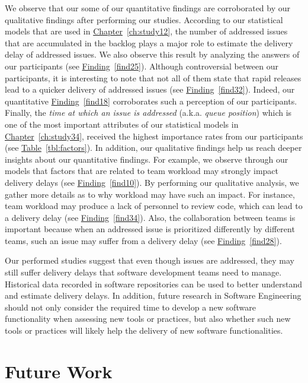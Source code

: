 We observe that our some of our quantitative findings are corroborated by our
qualitative findings after performing our studies. According to our statistical
models that are used in \hyperref[ch:study12]{Chapter}~\ref{ch:study12}, the
number of addressed issues that are accumulated in the backlog plays a major
role to estimate the delivery delay of addressed issues. We also observe this
result by analyzing the answers of our participants (see
\hyperref[find25]{Finding}~\ref{find25}). Although controversial between our
participants, it is interesting to note that not all of them state that rapid
releases lead to a quicker delivery of addressed issues (see
\hyperref[find32]{Finding}~\ref{find32}). Indeed, our quantitative
\hyperref[find18]{Finding}~\ref{find18} corroborates such a perception of our
participants. Finally, the {\em time at which an issue is addressed} (a.k.a.
{\em queue position}) which is one of the most important attributes of our
statistical models in \hyperref[ch:study34]{Chapter}~\ref{ch:study34}, received
the highest importance rates from our participants (see
\hyperref[tbl:factors]{Table}~\ref{tbl:factors}). In addition, our qualitative
findings help us reach deeper insights about our quantitative findings. For
example, we observe through our models that factors that are related to team
workload may strongly impact delivery delays (see
\hyperref[find10]{Finding}~\ref{find10}).  By performing our qualitative
analysis, we gather more details as to why workload may have such an impact. For
instance, team workload may produce a lack of personnel to review code, which
can lead to a delivery delay (see \hyperref[find34]{Finding}~\ref{find34}).
Also, the collaboration between teams is important because when an addressed
issue is prioritized differently by different teams, such an issue may suffer
from a delivery delay (see \hyperref[find28]{Finding}~\ref{find28}).

Our performed studies suggest that even though issues are addressed, they may
still suffer delivery delays that software development teams need to manage.
Historical data recorded in software repositories can be used to better
understand and estimate delivery delays. In addition, future research in
Software Engineering should not only consider the required time to develop a new
software functionality when assessing new tools or practices, but also whether
such new tools or practices will likely help the delivery of new software
functionalities.  

\section{Future Work}


